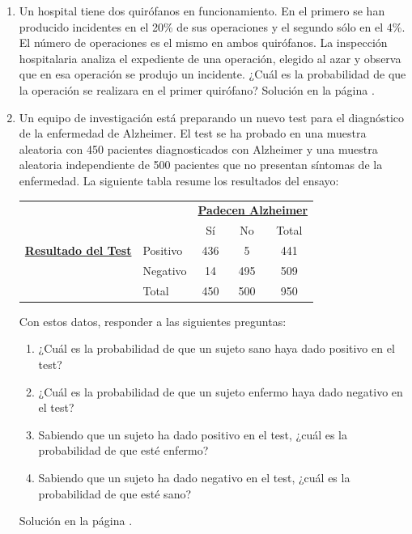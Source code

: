 \documentclass[10pt,a4paper]{article}\usepackage[]{graphicx}\usepackage[]{color}
\begin{document}
\begin{enumerate}
\item  \label{tut03:ejercicio28} Un hospital tiene dos quirófanos en funcionamiento. En el primero se han producido incidentes en el 20\% de sus operaciones y el segundo sólo en el 4\%. El número de operaciones es el mismo en ambos quirófanos. La inspección hospitalaria analiza el expediente de una operación, elegido  al azar y observa que en esa operación se produjo un incidente. ¿Cuál es la probabilidad de que la operación se realizara en el primer quirófano?
Solución en la página \pageref{tut03:ejercicio28:sol}. 


\item  \label{tut03:ejercicio29} Un equipo de investigación está preparando un nuevo test para el diagnóstico de la enfermedad de Alzheimer. El test se ha probado en una muestra aleatoria con 450 pacientes diagnosticados con Alzheimer y una muestra aleatoria independiente de 500 pacientes que no presentan síntomas de la enfermedad. La siguiente tabla resume los resultados del ensayo:
\begin{center}
\begin{tabular}{llccc}
&&\multicolumn{3}{c}{\underline{\bf Padecen Alzheimer}}\\

&          & Sí  & No  & Total\\
\hline
\underline{\bf Resultado del  Test} & Positivo & 436 & 5   & 441  \\
& Negativo & 14  & 495 & 509  \\
\hline
& Total    & 450 & 500 & 950  \\
\hline
\end{tabular}
\end{center}
Con estos datos, responder a las siguientes preguntas:
\begin{enumerate}
     \item ¿Cuál es la probabilidad de que un sujeto sano haya dado positivo en el test?
     \item ¿Cuál es la probabilidad de que un sujeto enfermo haya dado negativo en el test?
     \item Sabiendo que un sujeto ha dado positivo en el test, ¿cuál es la probabilidad de que esté enfermo?
     \item  Sabiendo que un sujeto ha dado negativo en el test, ¿cuál es la probabilidad de que esté sano?
\end{enumerate}
Solución en la página \pageref{tut03:ejercicio29:sol}. 


\end{enumerate}
\end{document}
